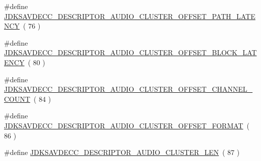 \begin{DoxyCompactItemize}
\#define \hyperlink{group__descriptor__audio__cluster_ga6c6e14ee00f39eb0711ab1f8159d2d73}{J\+D\+K\+S\+A\+V\+D\+E\+C\+C\+\_\+\+D\+E\+S\+C\+R\+I\+P\+T\+O\+R\+\_\+\+A\+U\+D\+I\+O\+\_\+\+C\+L\+U\+S\+T\+E\+R\+\_\+\+O\+F\+F\+S\+E\+T\+\_\+\+P\+A\+T\+H\+\_\+\+L\+A\+T\+E\+N\+CY}~( 76 )
\item 
\#define \hyperlink{group__descriptor__audio__cluster_gafe4912a6994a34ed707bb8dd8aac53a6}{J\+D\+K\+S\+A\+V\+D\+E\+C\+C\+\_\+\+D\+E\+S\+C\+R\+I\+P\+T\+O\+R\+\_\+\+A\+U\+D\+I\+O\+\_\+\+C\+L\+U\+S\+T\+E\+R\+\_\+\+O\+F\+F\+S\+E\+T\+\_\+\+B\+L\+O\+C\+K\+\_\+\+L\+A\+T\+E\+N\+CY}~( 80 )
\item 
\#define \hyperlink{group__descriptor__audio__cluster_ga412f6f128aedaf5b0c8d0bbe5f0af66b}{J\+D\+K\+S\+A\+V\+D\+E\+C\+C\+\_\+\+D\+E\+S\+C\+R\+I\+P\+T\+O\+R\+\_\+\+A\+U\+D\+I\+O\+\_\+\+C\+L\+U\+S\+T\+E\+R\+\_\+\+O\+F\+F\+S\+E\+T\+\_\+\+C\+H\+A\+N\+N\+E\+L\+\_\+\+C\+O\+U\+NT}~( 84 )
\item 
\#define \hyperlink{group__descriptor__audio__cluster_gae3f1692505a75d66bfe4802634250bdc}{J\+D\+K\+S\+A\+V\+D\+E\+C\+C\+\_\+\+D\+E\+S\+C\+R\+I\+P\+T\+O\+R\+\_\+\+A\+U\+D\+I\+O\+\_\+\+C\+L\+U\+S\+T\+E\+R\+\_\+\+O\+F\+F\+S\+E\+T\+\_\+\+F\+O\+R\+M\+AT}~( 86 )
\item 
\#define \hyperlink{group__descriptor__audio__cluster_ga1773710c3cbdaea84a913083b3be2fbb}{J\+D\+K\+S\+A\+V\+D\+E\+C\+C\+\_\+\+D\+E\+S\+C\+R\+I\+P\+T\+O\+R\+\_\+\+A\+U\+D\+I\+O\+\_\+\+C\+L\+U\+S\+T\+E\+R\+\_\+\+L\+EN}~( 87 )
\end{DoxyCompactItemize}
